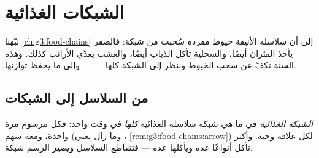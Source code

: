 \chapter{الشبكات الغذائية}\label{ch:g5:food-webs}

نبّهنا \cref{ch:g3:food-chains} إلى أن سلاسله الأنيقة خيوط مفردة
سُحبت من شبكة: فالصقر يأخذ الفئران أيضًا، والسحلية تأكل الذباب
أيضًا، والعشب يغذّي الأرانب كذلك. وهذه السنة نكفّ عن سحب الخيوط
وننظر إلى الشبكة كلها ---  --- وإلى ما يحفظ توازنها.

\section{من السلاسل إلى الشبكات}

\begin{definition}\label{def:g5:food-webs:web}
\emph{الشبكة الغذائية} في  ما هي شبكة
سلاسله الغذائية \emph{كلها} في وقت واحد: فكل  مرسوم مرة واحدة،
ومعه سهم (وما زال يعني \emph{}،
\cref{rem:g3:food-chains:arrow}) لكل علاقة وجبة. وأكثر 
تأكل أنواعًا عدة ويأكلها  عدة --- فتتقاطع السلاسل ويصير الرسم
شبكة.
\end{definition}

